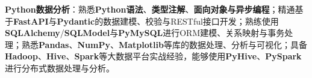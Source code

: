 \item \textbf{Python数据分析}：熟悉\textbf{Python语法}、\textbf{类型注解}、\textbf{面向对象与异步编程}；精通基于\textbf{FastAPI}与\textbf{Pydantic}的数据建模、校验与RESTful接口开发；熟练使用\textbf{SQLAlchemy}/\textbf{SQLModel}与\textbf{PyMySQL}进行ORM建模、关系映射与事务处理；熟悉\textbf{Pandas}、\textbf{NumPy}、\textbf{Matplotlib}等库的数据处理、分析与可视化；具备\textbf{Hadoop}、\textbf{Hive}、\textbf{Spark}等大数据平台实战经验，能够使用\textbf{PyHive}、\textbf{PySpark}进行分布式数据处理与分析。